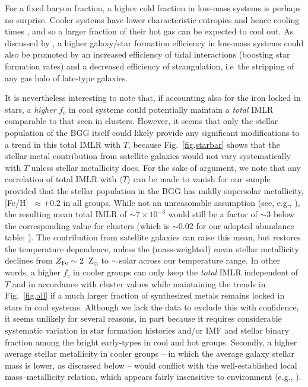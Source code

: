 \documentclass[useAMS,usenatbib]{mn2e}
\begin{document}
For a fixed baryon fraction, a higher cold fraction in low-mass
systems is perhaps no surprise. Cooler systems have lower
characteristic entropies \citep*{ponm03} and hence cooling times
\citep*{sand06}, and so a larger fraction of their hot gas can be
expected to cool out. As discussed by \citet{gonz07}, a higher
galaxy/star formation efficiency in low-mass systems could also be
promoted by an increased efficiency of tidal interactions (boosting
star formation rates) and a decreased efficiency of strangulation,
i.e\ the stripping of any gas halo of late-type galaxies.

It is nevertheless interesting to note that, if accounting also for
the iron locked in stars, a {\em higher} $f_c$ in cool systems could
potentially maintain a {\em total} IMLR comparable to that seen in
clusters.  However, it seems that only the stellar population of the
BGG itself could likely provide any significant modifications to a
trend in this total IMLR with $T$, because Fig.~\ref{fig,starbar}
shows that the stellar metal contribution from satellite galaxies
would not vary systematically with $T$ unless stellar metallicity
does. For the sake of argument, we note that any correlation of total
IMLR with $\langle T\rangle$ can be made to vanish for our sample
provided that the stellar population in the BGG has mildly supersolar
metallicity, [Fe/H]~$\approx +0.2$ in all groups. While not an
unreasonable assumption (see, e.g., \citealt{hump06}), the resulting
mean total IMLR of $\sim 7\times 10^{-3}$ would still be a factor of
$\sim 3$ below the corresponding value for clusters (which is $\sim
0.02$ for our adopted abundance table; \citealt{renz04}). The
contribution from satellite galaxies can raise this mean, but restores
the temperature dependence, unless the (mass-weighted) mean stellar
metallicity declines from $Z_{\rm Fe} \sim 2$~Z$_\odot$ to
$\sim$\,solar across our temperature range.  In other words, a higher
$f_c$ in cooler groups can only keep the {\em total} IMLR independent
of $T$ and in accordance with cluster values while maintaining the
trends in Fig.~\ref{fig,all} if a much larger fraction of synthesized
metals remains locked in stars in cool systems. Although we lack the
data to exclude this with confidence, it seems unlikely for several
reasons, in part because it requires considerable systematic variation
in star formation histories and/or IMF and stellar binary fraction
among the bright early-types in cool and hot groups. Secondly, a
higher average stellar metallicity in cooler groups -- in which the
average galaxy stellar mass is lower, as discussed below -- would
conflict with the well-established local mass--metallicity relation,
which appears fairly insensitive to environment (e.g.,
\citealt{bern03}).
\end{document}
